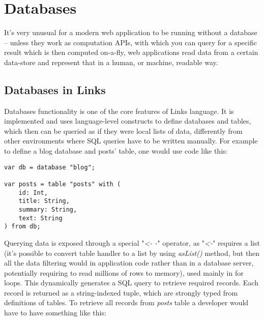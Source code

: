 
\chapter{Databases}

It's very unusual for a modern web application to be running without a database – unless they work as computation APIs, with which you can query for a specific result which is then computed on-a-fly, web applications read data from a certain data-store and represent that in a human, or machine, readable way.

\section{Databases in Links}

Databases functionality is one of the core features of Links language. It is implemented and uses language-level constructs to define databases and tables, which then can be queried as if they were local lists of data, differently from other environments where SQL queries have to be written manually. For example to define a blog database and posts' table, one would use code like this:

\begin{codelisting}
\begin{verbatim}
var db = database "blog"; 

var posts = table "posts" with ( 
    id: Int, 
    title: String, 
    summary: String, 
    text: String 
) from db;
\end{verbatim}
\end{codelisting}

Querying data is exposed through a special "\textit{\textless- -}" operator, as "\textit{\textless-}" requires a list (it's possible to convert table handler to a list by using \textit{asList()} method, but then all the data filtering would in application code rather than in a database server, potentially requiring to read millions of rows to memory), used mainly in for loops. This dynamically generates a SQL query to retrieve required records. Each record is returned as a string-indexed tuple, which are strongly typed from definitions of tables. To retrieve all records from \textit{posts} table a developer would have to have something like this:

